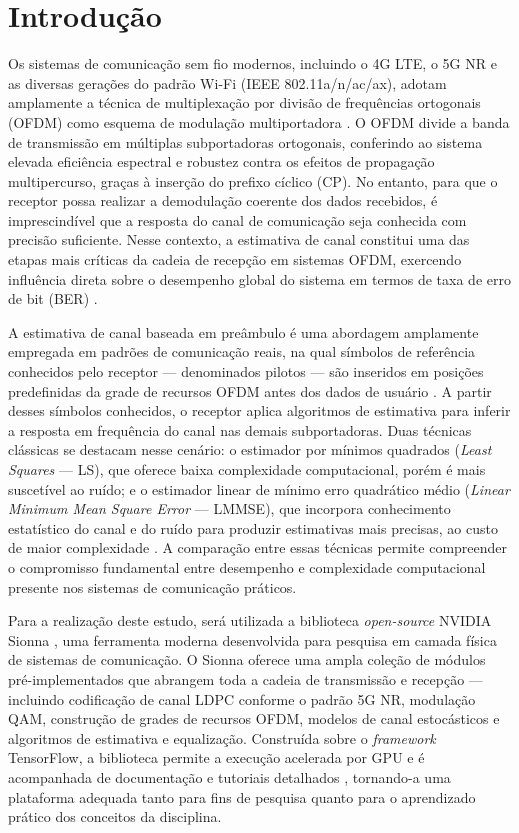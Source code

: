 \documentclass[conference]{IEEEtran}
\begin{document}
\section{Introdução}

Os sistemas de comunicação sem fio modernos, incluindo o 4G LTE, o 5G NR e as diversas gerações do padrão Wi-Fi (IEEE 802.11a/n/ac/ax), adotam amplamente a técnica de multiplexação por divisão de frequências ortogonais (OFDM) como esquema de modulação multiportadora \cite{goldsmith2005, proakis2008}. O OFDM divide a banda de transmissão em múltiplas subportadoras ortogonais, conferindo ao sistema elevada eficiência espectral e robustez contra os efeitos de propagação multipercurso, graças à inserção do prefixo cíclico (CP). No entanto, para que o receptor possa realizar a demodulação coerente dos dados recebidos, é imprescindível que a resposta do canal de comunicação seja conhecida com precisão suficiente. Nesse contexto, a estimativa de canal constitui uma das etapas mais críticas da cadeia de recepção em sistemas OFDM, exercendo influência direta sobre o desempenho global do sistema em termos de taxa de erro de bit (BER) \cite{3gpp38211}.

A estimativa de canal baseada em preâmbulo é uma abordagem amplamente empregada em padrões de comunicação reais, na qual símbolos de referência conhecidos pelo receptor --- denominados pilotos --- são inseridos em posições predefinidas da grade de recursos OFDM antes dos dados de usuário \cite{haykin2001}. A partir desses símbolos conhecidos, o receptor aplica algoritmos de estimativa para inferir a resposta em frequência do canal nas demais subportadoras. Duas técnicas clássicas se destacam nesse cenário: o estimador por mínimos quadrados (\textit{Least Squares} --- LS), que oferece baixa complexidade computacional, porém é mais suscetível ao ruído; e o estimador linear de mínimo erro quadrático médio (\textit{Linear Minimum Mean Square Error} --- LMMSE), que incorpora conhecimento estatístico do canal e do ruído para produzir estimativas mais precisas, ao custo de maior complexidade \cite{vanDeBeek1995, edfors1998}. A comparação entre essas técnicas permite compreender o compromisso fundamental entre desempenho e complexidade computacional presente nos sistemas de comunicação práticos.

Para a realização deste estudo, será utilizada a biblioteca \textit{open-source} NVIDIA Sionna \cite{hoydis2022}, uma ferramenta moderna desenvolvida para pesquisa em camada física de sistemas de comunicação. O Sionna oferece uma ampla coleção de módulos pré-implementados que abrangem toda a cadeia de transmissão e recepção --- incluindo codificação de canal LDPC conforme o padrão 5G NR, modulação QAM, construção de grades de recursos OFDM, modelos de canal estocásticos e algoritmos de estimativa e equalização. Construída sobre o \textit{framework} TensorFlow, a biblioteca permite a execução acelerada por GPU e é acompanhada de documentação e tutoriais detalhados \cite{sionna_doc}, tornando-a uma plataforma adequada tanto para fins de pesquisa quanto para o aprendizado prático dos conceitos da disciplina.
\end{document}
